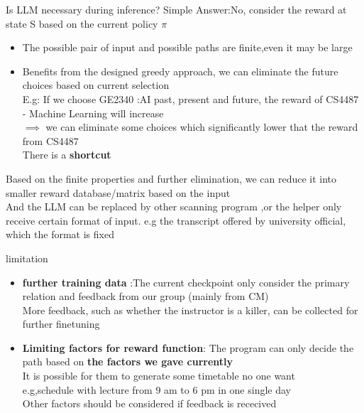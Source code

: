 \documentclass[aspectratio=169,11pt]{beamer}
\begin{document}
\begin{frame}{Is LLM necessary during inference?}
Simple Answer:No, consider the reward at state S based on the current policy $\pi$
\begin{itemize}\setlength{\itemsep}{6pt}
\item The possible pair of input and possible paths are finite,even it may be large
\item Benefits from the designed greedy approach, we can eliminate the future choices based on current selection\\
E.g: If we choose GE2340 :AI past, present and future, the reward of CS4487 - Machine Learning will increase\\
$\implies$ we can eliminate some choices which significantly lower that the reward from CS4487\\
There is a \textbf{shortcut}
\end{itemize}
Based on the finite properties and further elimination, we can reduce it into smaller reward database/matrix based on the input
\\ And the LLM can be replaced by other scanning program ,or the helper only receive certain format of input. e.g the transcript offered by university official, which the format is fixed 
\end{frame}
\begin{frame}{limitation}
\begin{itemize}
    \item \textbf{further training data} :The current checkpoint only consider the primary relation and feedback from our group (mainly from CM)\\
More feedback, such as whether the instructor is a killer, can be collected for further finetuning\\
\item \textbf{Limiting factors for reward function}: The program can only decide the path based on \textbf{the factors we gave currently}
\\ It is possible for them to generate some timetable no one want\\
e.g,schedule with lecture from 9 am to 6 pm in one single day\\
Other factors should be considered if feedback is rececived
\end{itemize}




\end{frame}
\end{document}
